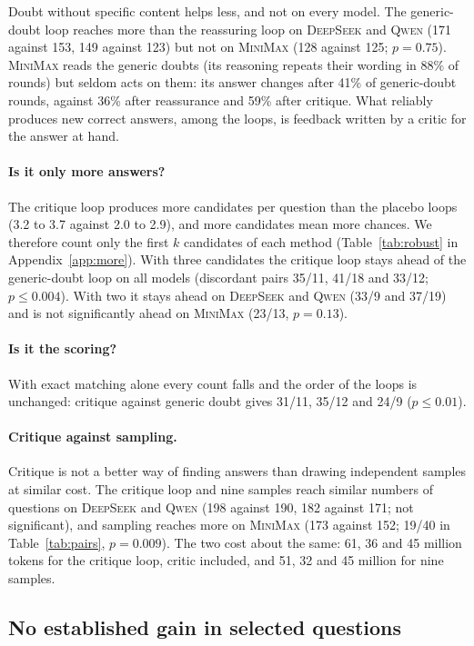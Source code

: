 \documentclass[11pt]{article}
\newcommand{\ds}{\textsc{DeepSeek}}
\newcommand{\qw}{\textsc{Qwen}}
\newcommand{\mm}{\textsc{MiniMax}}
\begin{document}
Doubt without specific content helps less, and not on every model.
The generic-doubt loop reaches more than the reassuring loop on \ds{} and \qw{} (171 against 153, 149 against 123) but not on \mm{} (128 against 125; $p=0.75$).
\mm{} reads the generic doubts (its reasoning repeats their wording in 88\% of rounds) but seldom acts on them: its answer changes after 41\% of generic-doubt rounds, against 36\% after reassurance and 59\% after critique.
What reliably produces new correct answers, among the loops, is feedback written by a critic for the answer at hand.

\paragraph{Is it only more answers?}
The critique loop produces more candidates per question than the placebo loops (3.2 to 3.7 against 2.0 to 2.9), and more candidates mean more chances.
We therefore count only the first $k$ candidates of each method (Table~\ref{tab:robust} in Appendix~\ref{app:more}).
With three candidates the critique loop stays ahead of the generic-doubt loop on all models (discordant pairs 35/11, 41/18 and 33/12; $p\le 0.004$).
With two it stays ahead on \ds{} and \qw{} (33/9 and 37/19) and is not significantly ahead on \mm{} (23/13, $p=0.13$).

\paragraph{Is it the scoring?}
With exact matching alone every count falls and the order of the loops is unchanged: critique against generic doubt gives 31/11, 35/12 and 24/9 ($p\le 0.01$).

\paragraph{Critique against sampling.}
Critique is not a better way of finding answers than drawing independent samples at similar cost.
The critique loop and nine samples reach similar numbers of questions on \ds{} and \qw{} (198 against 190, 182 against 171; not significant), and sampling reaches more on \mm{} (173 against 152; 19/40 in Table~\ref{tab:pairs}, $p=0.009$).
The two cost about the same: 61, 36 and 45 million tokens for the critique loop, critic included, and 51, 32 and 45 million for nine samples.


\subsection{No established gain in selected questions}
\label{sec:select}
\end{document}
